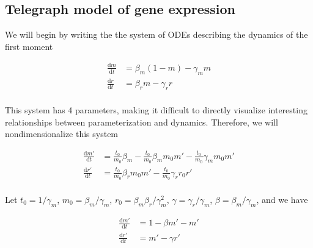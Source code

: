 \documentclass{ucetd}
\begin{document}
\begin{appendices}
\subsection{Telegraph model of gene expression}

We will begin by writing the the system of ODEs describing the dynamics of the first moment

\begin{align}
\frac{\mathrm{d}m}{\mathrm{d}t} &= \beta_{m}(1-m) - \gamma_m m\\
\frac{\mathrm{d}r}{\mathrm{d}t} &= \beta_{r} m - \gamma_r r\\
\end{align}

This system has 4 parameters, making it difficult to directly visualize interesting relationships between parameterization and dynamics. Therefore, we will nondimensionalize this system

\begin{align}
\frac{\mathrm{d}m'}{\mathrm{d}t} &= \frac{t_0}{m_0}\beta_{m} - \frac{t_0}{m_0}\beta_{m}m_{0}m' - \frac{t_0}{m_0}\gamma_m m_{0}m'\\
\frac{\mathrm{d}r'}{\mathrm{d}t} &= \frac{t_0}{m_0}\beta_{r} m_{0}m' - \frac{t_0}{m_0}\gamma_r r_{0}r'\\
\end{align}

Let $t_{0} = 1/\gamma_{m}$, $m_{0} = \beta_{m}/\gamma_{m}$, $r_{0} = \beta_{m}\beta_{r}/\gamma_{m}^{2}$, $\gamma = \gamma_{r}/\gamma_{m}$, $\beta = \beta_{m}/\gamma_{m}$, and we have

\begin{align}
\frac{\mathrm{d}m'}{\mathrm{d}t} &= 1 - \beta m' - m'\\
\frac{\mathrm{d}r'}{\mathrm{d}t} &= m' - \gamma r'\\
\end{align}





\end{appendices}
\end{document}

